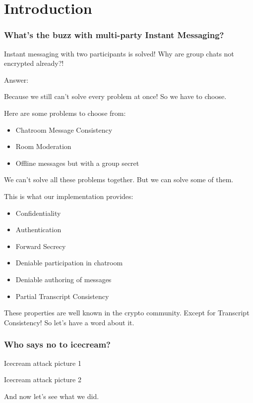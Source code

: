 \section{Introduction}


\begin{frame}
  \frametitle{What's the buzz with multi-party Instant Messaging?}
  \centering
  Instant messaging with two participants is solved!
  Why are group chats not encrypted already?!\\[0.3cm]
\end{frame}

\begin{frame}
  \centering
  Answer:

  Because we still can't solve every problem at once! So we have to choose.
\end{frame}

\begin{frame}

  Here are some problems to choose from:

  \begin{itemize}
    \item Chatroom Message Consistency
    \item Room Moderation
    \item Offline messages but with a group secret
  \end{itemize}

  \vfill

  We can't solve all these problems together. But we can solve some of them.

\end{frame}

\begin{frame}
  This is what our implementation provides:

  \begin{itemize}
    \item Confidentiality
    \item Authentication
    \item Forward Secrecy
    \item Deniable participation in chatroom
    \item Deniable authoring of messages
    \item Partial Transcript Consistency
  \end{itemize}

\end{frame}

\begin{frame}
These properties are well known in the crypto community.
\vfill
Except for Transcript Consistency!
\vfill
So let's have a word about it.
\end{frame}

\begin{frame}
  \frametitle{Who says no to icecream?}

  \begin{minipage}{0.47\textwidth}
    Icecream attack picture 1
  \end{minipage}
  \begin{minipage}{0.47\textwidth}
    Icecream attack picture 2
  \end{minipage}

\end{frame}

\begin{frame}
  And now let's see what we did.
\end{frame}
